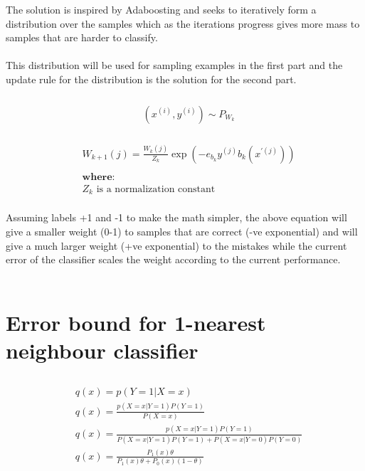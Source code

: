 \documentclass[letterpaper]{article}
\begin{document}
The solution is inspired by Adaboosting
and seeks to iteratively form a distribution over the samples which as the iterations
progress gives more mass to samples that are harder to classify.
\\
\\
This distribution will be used for sampling examples in the first part and the update
rule for the distribution is the solution for the second part.

\subsubsection{}


\begin{align*}
&(x^{(i)},y^{(i)}) \sim P_{W_{k}}
\end{align*}

\subsubsection{}

\begin{align*}
&W_{k+1}(j) = \frac{W_{k}(j)}{Z_{k}} \exp(-e_{b_{k}}y^{(j)}b_{k}(x^{'(j)}))\\\\
&\textbf{where:}\\
&Z_{k} \text{ is a normalization constant} \\
\end{align*}


Assuming labels +1 and -1 to make the math simpler, the above equation will
give a smaller weight (0-1) to samples that are correct (-ve exponential) and
will give a much larger weight (+ve exponential) to the mistakes while the
current error of the classifier scales the weight according to the current
performance.\\\\


\section{Error bound for 1-nearest neighbour classifier}

\subsection{}

\begin{align*}
&q(x) = p(Y=1|X=x)\\
&q(x) = \frac{p(X=x|Y=1)P(Y=1)}{P(X=x)}\\
&q(x) = \frac{p(X=x|Y=1)P(Y=1)}{P(X=x|Y=1)P(Y=1)+P(X=x|Y=0)P(Y=0)}\\
&q(x) = \frac{P_{1}(x)\theta}{P_{1}(x)\theta+P_{0}(x)(1-\theta)}\\
\end{align*}
\end{document}
